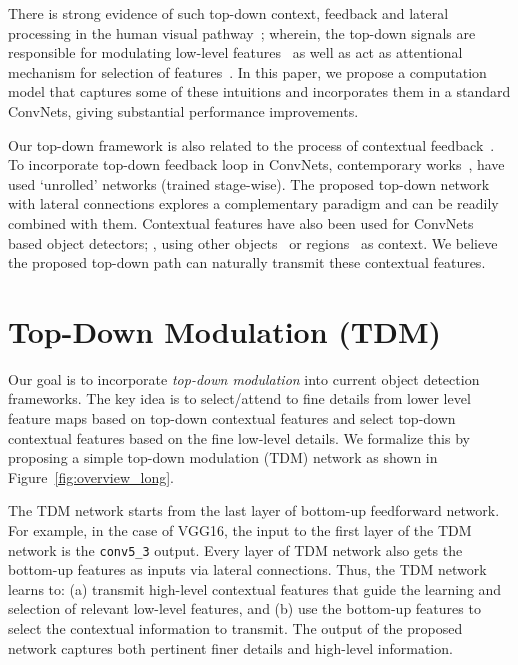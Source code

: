 \documentclass[10pt,twocolumn,letterpaper]{article}
\newcommand{\vv}[1]{{\texttt{#1}}}
\newcommand{\conv}{\vv{conv}}
\begin{document}
There is strong evidence of such top-down context, feedback and lateral processing in the human visual pathway~\cite{lamme1998feedforward,kravitz2013ventral,gilbert2007brain,lamme2000distinct,zanto2010top,zanto2011causal,gazzaley2012top,piech2013network,hopfinger2000neural,chun1999top}; wherein, the top-down signals are responsible for modulating low-level features~\cite{zanto2010top,zanto2011causal,gazzaley2012top,piech2013network,gilbert2007brain} as well as act as attentional mechanism for selection of features~\cite{hopfinger2000neural,chun1999top}. In this paper, we propose a computation model that captures some of these intuitions and incorporates them in a standard ConvNets, giving substantial performance improvements.

Our top-down framework is also related to the process of contextual feedback~\cite{bachmann2015hidden}. To incorporate top-down feedback loop in ConvNets, contemporary works~\cite{ief,gatta2014unrolling,li2015iterative,shrivastava2016contextual}, have used `unrolled' networks (trained stage-wise).
The proposed top-down network with lateral connections explores a complementary paradigm and can be readily combined with them. Contextual features have also been used for ConvNets based object detectors; \eg, using other objects~\cite{gupta2015exploring} or regions~\cite{gkioxari2015contextual} as context. We believe the proposed top-down path can naturally transmit these contextual features.

\vspace{-0.01in}
\section{Top-Down Modulation (TDM)}\label{sec:approach}
\vspace{-0.01in}

Our goal is to incorporate \emph{top-down modulation} into current object detection frameworks. The key idea is to select/attend to fine details from lower level feature maps based on top-down contextual features and select top-down contextual features based on the fine low-level details. We formalize this by proposing a simple top-down modulation (TDM) network  as shown in Figure~\ref{fig:overview_long}. 

The TDM network starts from the last layer of bottom-up feedforward network. For example, in the case of VGG16, the input to the first layer of the TDM network is the \conv\verb|5_3| output. Every layer of TDM network also gets the bottom-up features as inputs via lateral connections. Thus, the TDM network learns to: (a) transmit high-level contextual features that guide the learning and selection of relevant low-level features, and (b) use the bottom-up features to select the contextual information to transmit. The output of the proposed network captures both pertinent finer details and high-level information.
\end{document}
